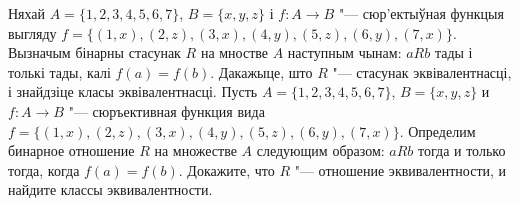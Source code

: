 \documentclass[12pt, a4paper]{article}
\begin{document}
\begin{problemList}
\smallskip

\problemItemSimple
{Няхай $A = \{1, 2, 3, 4, 5, 6, 7\}$, $B = \{x, y, z\}$ і $f \colon A \to B$ "--- сюр'ектыўная функцыя выгляду $f = \{(1, x), (2, z), (3, x), (4, y), (5, z), (6, y), (7, x)\}$.
Вызначым бінарны стасунак $R$ на мностве $A$ наступным чынам: $aRb$ тады і толькі тады, калі $f(a) = f(b)$. Дакажыце, што $R$ "---  стасунак эквівалентнасці, і знайдзіце класы эквівалентнасці.}
{Пусть $A = \{1, 2, 3, 4, 5, 6, 7\}$, $B = \{x, y, z\}$ и $f \colon A \to B$ "---
сюръективная функция вида $f = \{(1, x), (2, z), (3, x), (4, y), (5, z), (6, y), (7, x)\}$.
Определим бинарное отношение $R$ на множестве $A$ следующим образом: $aRb$ тогда и только тогда, когда $f(a) = f(b)$. Докажите, что $R$ "--- отношение эквивалентности, и найдите классы эквивалентности.}

\end{problemList}
\end{document}
